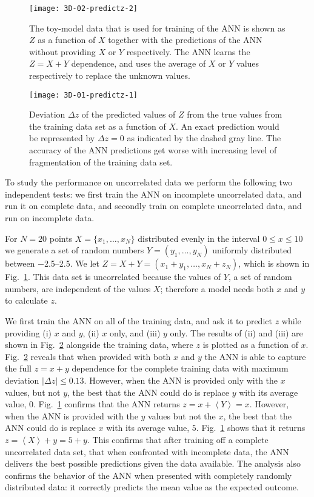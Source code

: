 \documentclass[review]{elsarticle}
\newcommand{\figref}[1]{Fig.~\ref{#1}}
\newcommand{\anglemean}[1]{\left\langle#1\right\rangle}
\newcommand{\change}[1]{#1}
\begin{document}
\begin{figure}
 \centering
 \texttt{[image: 3D-02-predictz-2]}
 \caption{The toy-model data that is used for training of the ANN is shown
   as $Z$ as a function of $X$ together with the predictions of the ANN
   without providing $X$ or $Y$ respectively. The ANN learns the $Z=X+Y$
   dependence, and uses the average of $X$ or $Y$ values respectively to
   replace the unknown values.}
 \label{fig:3D-02-predictz-2}
\end{figure}

\begin{figure}
 \centering
 \texttt{[image: 3D-01-predictz-1]}
 \caption{Deviation $\Delta z$ of the predicted values of $Z$ from the true
   values from the training data set as a function of $X$. An exact
   prediction would be represented by $\Delta z=0$ as indicated by the
   dashed gray line. The accuracy of the ANN predictions get worse with
   increasing level of fragmentation of the training data set.}
 \label{fig:3D-01-predictz-1}
\end{figure}

To study the performance on uncorrelated data we perform the following two
independent tests: we first train the ANN on incomplete uncorrelated data,
and run it on complete data, and secondly train on complete uncorrelated
data, and run on incomplete data.

For $N=20$ points $X=\{x_1,\ldots,x_N\}$ distributed evenly in the interval
$0\le x\le10$ we generate a set of random numbers $Y=(y_1,\ldots,y_N)$
uniformly distributed between \numrange{-2.5}{2.5}. We let
$Z=X+Y=(x_1+y_1,\ldots,x_N+z_N)$, which is shown in
\figref{fig:3D-02-predictz-2}. This data set is uncorrelated because the
values of $Y$, a set of random numbers, are independent of the values $X$;
therefore a model needs both $x$ and $y$ to calculate $z$.

We first train the ANN on all of the training data, and ask it to predict
$z$ while providing (i) $x$ and $y$, (ii) $x$ only, and (iii) $y$ only. The
results of (ii) and (iii) are shown in \figref{fig:3D-01-predictz-1}
alongside the training data, where $z$ is plotted as a function of $x$.
\figref{fig:3D-01-predictz-1} reveals that when provided with both $x$ and
$y$ the ANN is able to capture the full $z=x+y$ dependence for the complete
training data with maximum deviation $|\Delta z|\leq0.13$.  However, when
the ANN is provided only with the $x$ values, but not $y$, the best that the
ANN could do is replace $y$ with its average value,
$0$. \figref{fig:3D-02-predictz-2} confirms that the ANN returns
$z=x+\anglemean{Y}=x$. However, when the ANN is provided with the $y$ values
but not the $x$, the best that the ANN could do is replace $x$ with its
average value, $5$. \figref{fig:3D-02-predictz-2} shows that it returns
$z=\anglemean{X}+y=5+y$. This confirms that after training off a complete
uncorrelated data set, that when confronted with incomplete data, the ANN
delivers the best possible predictions given the data available.
\change{The analysis also confirms the behavior of the ANN when presented
  with completely randomly distributed data: it correctly predicts the mean
  value as the expected outcome.}
\end{document}
